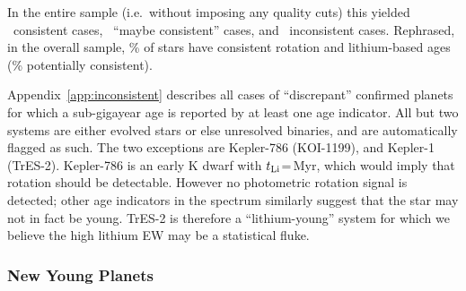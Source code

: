 \documentclass[11pt,twocolumn,tighten]{aastex63}
\begin{document}
In the entire sample (i.e.~without imposing any quality cuts) this
yielded \allagesyesconsistent\ consistent cases,
\allagesmaybeconsistent\ ``maybe consistent'' cases, and
\allagesnoconsistent\ inconsistent cases.  Rephrased, in the overall
sample, \fracconsistentallages\% of stars have consistent rotation and
lithium-based ages (\fracpotentiallyconsistentallages\% potentially
consistent).

Appendix~\ref{app:inconsistent} describes all cases of ``discrepant''
confirmed planets for which a sub-gigayear age is reported by at least
one age indicator.  All but two systems are either evolved stars or
else unresolved binaries, and are automatically flagged as such.  The
two exceptions are Kepler-786 (KOI-1199), and Kepler-1 (TrES-2).
Kepler-786 is an early K dwarf with $t_{\rm
Li}$=\kepseveneightsix\,Myr, which would imply that rotation should be
detectable.  However no photometric rotation signal is detected; other
age indicators in the spectrum similarly suggest that the star may not
in fact be young.  TrES-2 is therefore a ``lithium-young'' system for
which we believe the high lithium EW may be a statistical fluke.



\subsubsection{New Young Planets}
%
\end{document}
